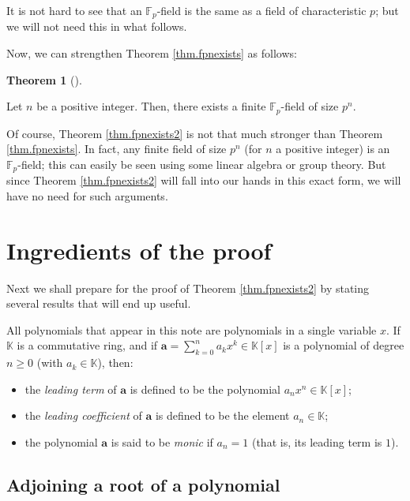 \documentclass[numbers=enddot,12pt,final,onecolumn,notitlepage]{scrartcl}%
\theoremstyle{definition}
\newtheorem{theo}{Theorem}[subsection]
\newenvironment{theorem}[1][]
{\begin{theo}[#1]\begin{leftbar}}
{\end{leftbar}\end{theo}}
\let\sumnonlimits\sum
\renewcommand{\sum}{\sumnonlimits\limits}
\begin{document}
It is not hard to see that an $\mathbb{F}_{p}$-field is the same as a field of
characteristic $p$; but we will not need this in what follows.

Now, we can strengthen Theorem \ref{thm.fpnexists} as follows:

\begin{theorem}
\label{thm.fpnexists2}Let $n$ be a positive integer. Then, there exists a
finite $\mathbb{F}_{p}$-field of size $p^{n}$.
\end{theorem}

Of course, Theorem \ref{thm.fpnexists2} is not that much stronger than Theorem
\ref{thm.fpnexists}. In fact, any finite field of size $p^{n}$ (for $n$ a
positive integer) is an $\mathbb{F}_{p}$-field; this can easily be seen using
some linear algebra or group theory. But since Theorem \ref{thm.fpnexists2}
will fall into our hands in this exact form, we will have no need for such arguments.

\section{Ingredients of the proof}

Next we shall prepare for the proof of Theorem \ref{thm.fpnexists2} by stating
several results that will end up useful.

All polynomials that appear in this note are polynomials in a single variable
$x$. If $\mathbb{K}$ is a commutative ring, and if $\mathbf{a}=\sum_{k=0}%
^{n}a_{k}x^{k}\in\mathbb{K}\left[  x\right]  $ is a polynomial of degree
$n\geq0$ (with $a_{k}\in\mathbb{K}$), then:

\begin{itemize}
\item the \textit{leading term} of $\mathbf{a}$ is defined to be the
polynomial $a_{n}x^{n}\in\mathbb{K}\left[  x\right]  $;

\item the \textit{leading coefficient} of $\mathbf{a}$ is defined to be the
element $a_{n}\in\mathbb{K}$;

\item the polynomial $\mathbf{a}$ is said to be \textit{monic} if $a_{n}=1$
(that is, its leading term is $1$).
\end{itemize}

\subsection{Adjoining a root of a polynomial}
\end{document}
